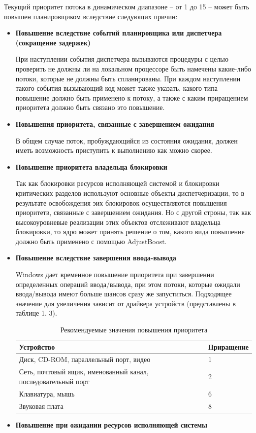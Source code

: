 Текущий приоритет потока в динамическом диапазоне – от 1 до 15 – может быть повышен планировщиком вследствие следующих причин:
\begin{itemize}
	\item \textbf{Повышение вследствие событий планировщика или диспетчера (сокращение задержек)}
	
	При наступлении события диспетчера вызываются процедуры с целью проверить не должны ли на локальном процессоре быть намечены какие-либо потоки, которые не должны быть спланированы. 
	При каждом наступлении такого события вызывающий код может также указать, какого типа повышение должно быть применено к потоку,
	а также с каким приращением приоритета должно быть связано это повышение.
	
	\item \textbf{Повышения приоритета, связанные с завершением ожидания}
	
	В общем случае поток, пробуждающийся из состояния ожидания, должен иметь возможность приступить к выполнению как можно скорее.
	\item \textbf{Повышение приоритета владельца блокировки}
	
	Так как блокировки ресурсов исполняющей системой и блокировки критических разделов используют основные объекты диспетчеризации, 
	то в результате освобождения эих блокировок осуществляются повышения приоритетв, связанные с завершением ожидания. 
	Но с другой строны, так как высокоуровневые реализации этих объектов отслеживают владельца блокировки, то ядро может принять решение
	о том, какого вида повышение должно быть применено с помощью AdjustBoost.
	
	\item \textbf{Повышение вследствие завершения ввода-вывода}
	
	Windows дает временное повышение приоритета при завершении определенных операций ввода/вывода, при этом потоки, которые ожидали ввода/вывода имеют больше шансов сразу же запуститься. Подходящее значение для увеличения зависит от драйвера устройств (представлены в таблице 1. 3).
	\FloatBarrier
	\begin{table}[h]
		\caption{Рекомендуемые значения повышения приоритета}
		\begin{center}
			\begin{tabular}{| p{245pt} | p{100pt} |}
				\hline
				\textbf{Устройство} & \textbf{Приращение} \\
				\hline
				Диск, CD-ROM, параллельный порт, видео & 1 \\
				\hline
				Сеть, почтовый ящик, именованный канал,
				последовательный порт & 2 \\
				\hline
				Клавиатура, мышь & 6 \\
				\hline
				Звуковая плата & 8 \\
				\hline
			\end{tabular}
		\end{center}
	\end{table}
	\FloatBarrier
	\item \textbf{Повышение при ожидании ресурсов исполняющей системы}
	

\end{itemize}
